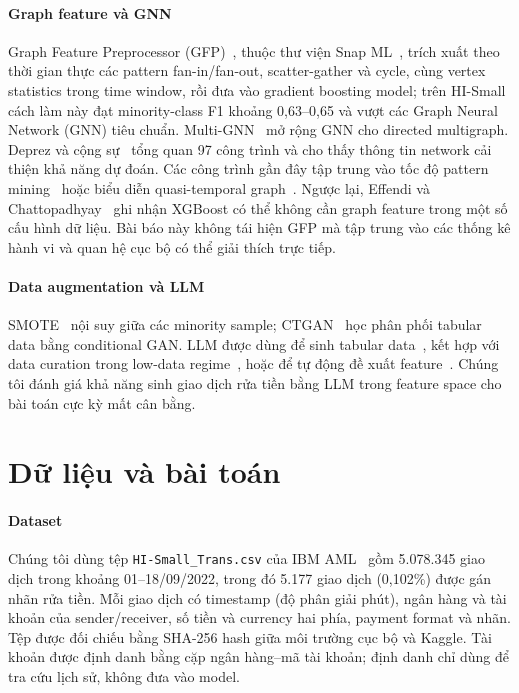 \documentclass[sigconf,nonacm]{acmart}
\begin{document}
\paragraph{Graph feature và GNN} Graph Feature Preprocessor (GFP)~\cite{blanusa2024gfp}, thuộc thư viện Snap
ML~\cite{dunner2018snapml}, trích xuất theo thời gian thực các pattern fan-in/fan-out, scatter-gather và cycle, cùng
vertex statistics trong time window, rồi đưa vào gradient boosting model; trên HI-Small cách làm này đạt minority-class
F1 khoảng 0,63--0,65 và vượt các Graph Neural Network (GNN) tiêu chuẩn. Multi-GNN~\cite{egressy2024multignn} mở rộng
GNN cho directed multigraph. Deprez và cộng sự~\cite{deprez2024network} tổng quan 97 công trình và cho thấy thông tin
network cải thiện khả năng dự đoán. Các công trình gần đây tập trung vào tốc độ pattern mining~\cite{ye2026blazingaml}
hoặc biểu diễn quasi-temporal graph~\cite{tariq2026exstraqt}. Ngược lại, Effendi và Chattopadhyay~\cite{effendi2024fhe}
ghi nhận XGBoost có thể không cần graph feature trong một số cấu hình dữ liệu. Bài báo này không tái hiện GFP mà tập
trung vào các thống kê hành vi và quan hệ cục bộ có thể giải thích trực tiếp.

\paragraph{Data augmentation và LLM} SMOTE~\cite{chawla2002smote} nội suy giữa các minority sample;
CTGAN~\cite{xu2019ctgan} học phân phối tabular data bằng conditional GAN. LLM được dùng để sinh tabular
data~\cite{borisov2023great}, kết hợp với data curation trong low-data regime~\cite{seedat2024cllm}, hoặc để tự động
đề xuất feature~\cite{hollmann2023caafe,abhyankar2025llmfe}. Chúng tôi đánh giá khả năng sinh giao dịch rửa tiền bằng
LLM trong feature space cho bài toán cực kỳ mất cân bằng.

\section{Dữ liệu và bài toán}

\paragraph{Dataset} Chúng tôi dùng tệp \texttt{HI-Small\_Trans.csv} của IBM AML~\cite{ibmamlkaggle} gồm 5.078.345
giao dịch trong khoảng 01--18/09/2022, trong đó 5.177 giao dịch (0,102\%) được gán nhãn rửa tiền. Mỗi giao dịch có
timestamp (độ phân giải phút), ngân hàng và tài khoản của sender/receiver, số tiền và currency hai phía, payment format
và nhãn. Tệp được đối chiếu bằng SHA-256 hash giữa môi trường cục bộ và Kaggle. Tài khoản được định danh bằng cặp
ngân hàng--mã tài khoản; định danh chỉ dùng để tra cứu lịch sử, không đưa vào model.
\end{document}
